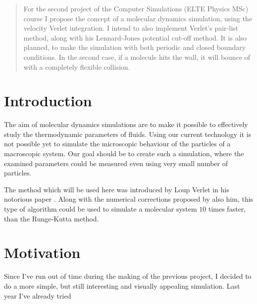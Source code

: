 \begin{abstract}
    \noindent For the second project of the Computer Simulations (ELTE Physics MSc) course I propose the concept of a molecular dynamics simulation, using the velocity Verlet integration. I intend to also implement Verlet's pair-list method, along with his Lennard-Jones potential cut-off method. It is also planned, to make the simulation with both periodic and closed boundary conditions. In the second case, if a molecule hits the wall, it will bounce of with a completely flexible collision.
\end{abstract}

\begin{multicols}{2}
\section{Introduction}
The aim of molecular dynamics simulations are to make it possible to effectively study the thermodynamic parameters of fluids. Using our current technology it is not possible yet to simulate the microscopic behaviour of the particles of a macroscopic system. Our goal should be to create such a simulation, where the examined parameters could be measured even using very small number of particles. \par
The method which will be used here was introduced by Loup Verlet in his notorious paper \citep{verlet1967computer}. Along with the numerical corrections proposed by also him, this type of algorithm could be used to simulate a molecular system $10$ times faster, than the Runge-Kutta method.

\section{Motivation}
Since I've run out of time during the making of the previous project, I decided to do a more simple, but still interesting and visually appealing simulation. Last year I've already tried 


\end{multicols}

